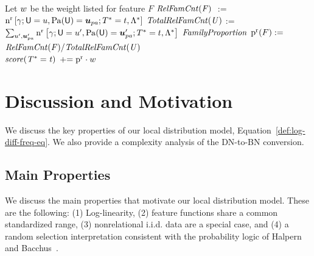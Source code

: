 \documentclass[runningheads,a4paper]{llncs}
\renewcommand{\Qconj}{\Appendterm{\FG{\TT} = \TV} {\QC}} %
\begin{document}
\begin{algorithm}[htbp]
\begin{algorithmic}[1]
\STATE  Let $w $ be the weight listed for feature $F$ 
\STATE {}
	\STATE   $\it{RelFamCnt}(F)$ $ :=$ $\Relcount{{\grounding}; \Appendterm{{\UI}  = \UV} {{\Pa{\UI}} = \Prange{\UT}}} {\Qconj}$
	\STATE $\it{TotalRelFamCnt}(U)$ := $\sum_{\UV',\Prange{\UT}'}\Relcount{ {\grounding}; \Appendterm{{\UI}  = \UV'} {{\Pa{\UI}} = \Prange{\UT}'}} {\Qconj}$
	\STATE  $\it{Family Proportion }$ $ \mathrm{p}^{\mathrm{r}}(F) :=$ $\it{RelFamCnt}(F)/\it{TotalRelFamCnt}(U)$ \\
	\STATE   $\it{score}(T^{*}\hspace{0.0ex} = t)$ $\mathrel{+}= \mathrm{p}^{\mathrm{r}}  \cdot  w $
\ENDFOR
\STATE {}
\end{algorithmic}
\caption{Computing local probability distributions, the parameters of the Inference  Dependency Network. %
\label{alg:log-linear}}
\end{algorithm}



\section{Discussion and Motivation} 

We discuss the key properties of our local distribution model, Equation~\eqref{def:log-diff-freq-eq}. We also provide a complexity analysis of the DN-to-BN conversion.

\subsection{Main Properties} We discuss the main properties that motivate our local distribution model. These are the following: (1) Log-linearity, (2) feature functions share a common standardized range, (3) nonrelational i.i.d. data are a special case, and (4) a random selection interpretation consistent with the probability logic of Halpern and Bacchus~\cite{Halpern90,Bacchus90,Schulte2014}.
\end{document}
